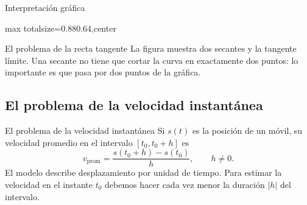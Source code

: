 \documentclass[12pt,aspectratio=169]{beamer}
\begin{document}
\begin{frame}[t,allowframebreaks]{Interpretación gráfica}
\begin{center}
\begin{adjustbox}{max totalsize={0.88\linewidth}{0.64\textheight},center}\end{adjustbox}
\end{center}
\end{frame}


\begin{frame}[t,allowframebreaks]{El problema de la recta tangente}
La figura muestra dos secantes y la tangente límite. Una secante no tiene que cortar la curva en exactamente dos puntos: lo importante es que pasa por dos puntos de la gráfica.
\end{frame}


\subsection{El problema de la velocidad instantánea}

\begin{frame}[t,allowframebreaks]{El problema de la velocidad instantánea}
Si $s(t)$ es la posición de un móvil, su velocidad promedio en el intervalo $[t_0,t_0+h]$ es
\[
 v_{\mathrm{prom}}=\frac{s(t_0+h)-s(t_0)}{h},\qquad h\ne0.
\]
El modelo describe desplazamiento por unidad de tiempo. Para estimar la velocidad en el instante $t_0$ debemos hacer cada vez menor la duración $|h|$ del intervalo.
\end{frame}
\end{document}
